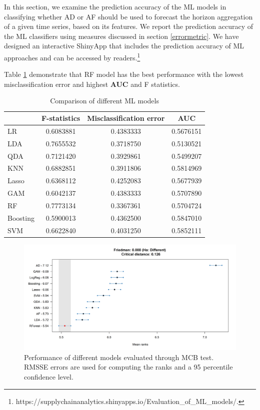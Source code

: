 \documentclass[]{elsarticle} %
\begin{document}
In this section, we examine the prediction accuracy of the ML models in
classifying whether AD or AF should be used to forecast the horizon
aggregation of a given time series, based on its features. We report the
prediction accuracy of the ML classifiers using measures discussed in
section \ref{errormetric}. We have designed an interactive ShinyApp that
includes the prediction accuracy of ML approaches and can be accessed by
readers.\footnote{https://supplychainanalytics.shinyapps.io/Evaluation\_of\_ML\_models/.}

Table \ref{tab:cost} demonstrate that RF model has the best performance
with the lowest misclassification error and highest \textbf{AUC} and F
statistics.

\begin{table}
\caption{\label{tab:cost}Comparison of different ML models}
\centering
\begin{tabular}[t]{lccc}
\hline
 & F-statistics & Misclassification error & AUC\\
\hline
LR &  0.6083881 &  0.4383333 & 0.5676151\\
\hline
LDA & 0.7655532 & 0.3718750 & 0.5130521\\
\hline
QDA &  0.7121420 & 0.3929861 & 0.5499207\\
\hline
KNN &  0.6882851 & 0.3911806 & 0.5814969\\
\hline
Lasso & 0.6368112 & 0.4252083 & 0.5677939\\
\hline
GAM &  0.6042137 & 0.4383333 & 0.5707890\\
\hline
RF & 0.7773134 & 0.3367361 & 0.5704724\\
\hline
Boosting & 0.5900013 & 0.4362500 & 0.5847010\\
\hline
SVM & 0.6622840 & 0.4031250 & 0.5852111\\
\hline
\end{tabular}
\end{table}

\begin{figure}[H]

{\centering \includegraphics[width=1\linewidth]{img/300dpi/Fig_MCB_all} 

}

\caption{Performance of different models evaluated through MCB test. RMSSE errors are used for computing the ranks and a 95 percentile confidence level.}\label{fig:MCB_ML}
\end{figure}
\end{document}
